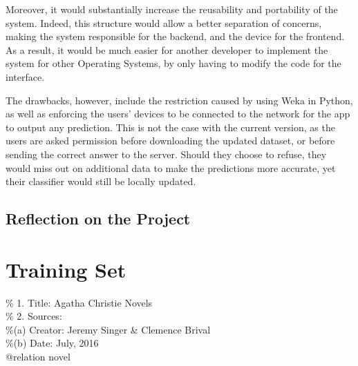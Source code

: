 \documentclass{mproj}
\begin{document}
Moreover, it would substantially increase the reusability and portability of the system. Indeed, this structure would allow a better separation of concerns, making the system responsible for the backend, and the device for the frontend. As a result, it would be much easier for another developer to implement the system for other Operating Systems, by only having to modify the code for the interface. \par

The drawbacks, however, include the restriction caused by using Weka in Python, as well as enforcing the users' devices to be connected to the network for the app to output any prediction. This is not the case with the current version, as the users are asked permission before downloading the updated dataset, or before sending the correct answer to the server. Should they choose to refuse, they would miss out on additional data to make the predictions more accurate, yet their classifier would still be locally updated.

\section{Reflection on the Project}





\appendix


\chapter{Training Set}\label{dataset}

\% 1. Title: Agatha Christie Novels\\
\% 2. Sources:\\
\%\hspace{5mm}(a) Creator: Jeremy Singer \& Clemence Brival\\
\%\hspace{5mm}(b) Date: July, 2016\\
@relation novel
\end{document}
